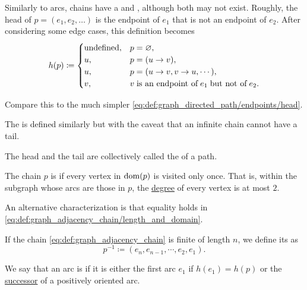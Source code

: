 \begin{definition}
\begin{thmenum}
     Similarly to arcs, chains have a  and , although both may not exist. Roughly, the head of \( p = (e_1, e_2, \ldots) \) is the endpoint of \( e_1 \) that is not an endpoint of \( e_2 \). After considering some edge cases, this definition becomes
    \begin{equation}\label{eq:def:graph_adjacency_chain/endpoints/head}
      h(p) \coloneqq \begin{cases}
        \T{undefined}, &p = \varnothing, \\
        u,             &p = (u \to v), \\
        u,             &p = (u \to v, v \to u, \cdots), \\
        v,             &v \T{is an endpoint of} e_1 \T{but not of} e_2.
      \end{cases}
    \end{equation}

    Compare this to the much simpler \eqref{eq:def:graph_directed_path/endpoints/head}.

    The  is defined similarly but with the caveat that an infinite chain cannot have a tail.

    The head and the tail are collectively called the  of a path.

     The chain \( p \) is  if every vertex in \( \operatorname{dom}(p) \) is visited only once. That is, within the subgraph whose arcs are those in \( p \), the \hyperref[def:graph_incidence/degree]{degree} of every vertex is at most \( 2 \).

    An alternative characterization is that equality holds in \eqref{eq:def:graph_adjacency_chain/length_and_domain}.

     If the chain \eqref{eq:def:graph_adjacency_chain} is finite of length \( n \), we define its  as
    \begin{equation*}
      p^{-1} \coloneqq (e_n, e_{n-1}, \cdots, e_2, e_1).
    \end{equation*}

     We say that an arc is  if it is either the first arc \( e_1 \) if \( h(e_1) = h(p) \) or the \hyperref[def:graph/adjacency]{successor} of a positively oriented arc.


\end{thmenum}
\end{definition}
